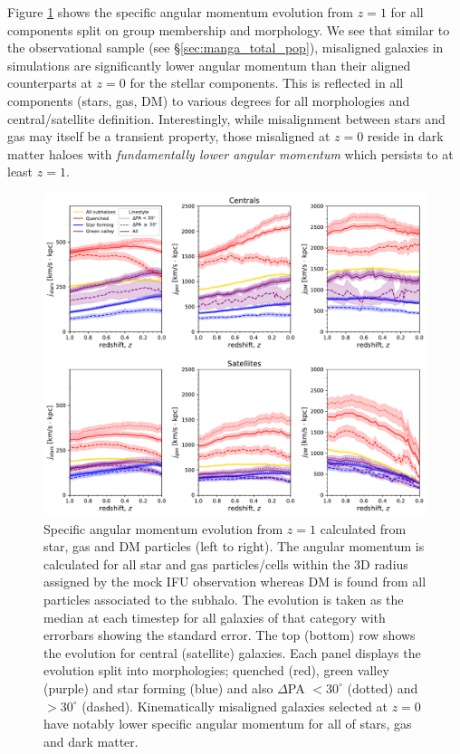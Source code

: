 \documentclass[fleqn,usenatbib]{mnras}
\begin{document}
Figure \ref{fig:sJ_evo} shows the specific angular momentum evolution from $z=1$ for all components split on group membership and morphology. We see that similar to the observational sample (see \S\ref{sec:manga_total_pop}), misaligned galaxies in simulations are significantly lower angular momentum than their aligned counterparts at $z=0$ for the stellar components. This is reflected in all components (stars, gas, DM) to various degrees for all morphologies and central/satellite definition. Interestingly, while misalignment between stars and gas may itself be a transient property, those misaligned at $z = 0$ reside in dark matter haloes with \textit{fundamentally lower angular momentum} which persists to at least $z = 1$. 

\begin{figure}
	\includegraphics[width=\linewidth]{tng_results/sJ_evo_cen_sat.pdf}
    \caption{Specific angular momentum evolution from $z = 1$ calculated from star, gas and DM particles (left to right). The angular momentum is calculated for all star and gas particles/cells within the 3D radius assigned by the mock IFU observation whereas DM is found from all particles associated to the subhalo. The evolution is taken as the median at each timestep for all galaxies of that category with errorbars showing the standard error. The top (bottom) row shows the evolution for central (satellite) galaxies. Each panel displays the evolution split into morphologies; quenched (red), green valley (purple) and star forming (blue) and also $\Delta$PA $< 30^{\circ}$ (dotted) and $> 30^{\circ}$ (dashed). Kinematically misaligned galaxies selected at $z=0$ have notably lower specific angular momentum for all of stars, gas and dark matter.}
    \label{fig:sJ_evo}
\end{figure}
\end{document}

